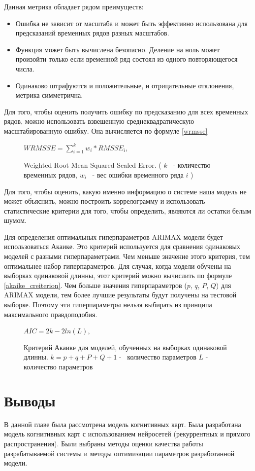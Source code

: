 Данная метрика обладает рядом преимуществ:

\begin{itemize}
	\item Ошибка не зависит от масштаба и может быть эффективно использована для предсказаний временных рядов разных масштабов.
	\item Функция может быть вычислена безопасно. Деление на ноль может произойти только если временной ряд состоял из одного повторяющегося числа.
	\item Одинаково штрафуются и положительные, и отрицательные отклонения, метрика симметрична.
\end{itemize}

Для того, чтобы оценить получить ошибку по предсказанию для всех временных рядов,
можно использовать взвешенную среднеквадратическую масштабированную ошибку.
Она вычисляется по формуле \ref{wrmsse}

\def\figurename{Формула}
\begin{figure}
	\centering
	$ WRMSSE = \sum_{i=1}^{k} w_i * RMSSE_i $,
	\caption{
		Weighted Root Mean Squared Scaled Error.
		(
			$ k $ ~- количество временных рядов,
			$ w_i $ ~- вес ошибки временного ряда $ i $
		)
	}
	\label{img:wrmsse}
\end{figure}
\def\figurename{Рис.}

Для того, чтобы оценить, какую именно информацию о системе наша
модель не может объяснить, можно построить коррелограмму и использовать
статистические критерии для того, чтобы определить, являются ли остатки
белым шумом.

Для определения оптимальных гиперпараметров ARIMAX модели будет использоваться Акаике.
Это критерий используется для сравнения одинаковых моделей с разными гиперпараметрами.
Чем меньше значение этого критерия, тем оптимальнее набор гиперпараметров.
Для случая, когда модели обучены на выборках одинаковой длинны, этот критерий можно вычислить по формуле \ref{akaike_creiterion}.
Чем больше значения гиперпараметров ($ p $, $ q $, $ P $, $ Q $) для ARIMAX модели, тем более лучшие
результаты будут получены на тестовой выборке. Поэтому эти гиперпараметры нельзя
выбирать из принципа максимального правдоподобия.

\def\figurename{Формула}
\begin{figure}
	\centering
	$ AIC = 2k - 2 ln(L) $,
	\caption{
		Критерий Акаике для моделей, обученных на выборках одинаковой длинны.
		$ k = p + q + P + Q + 1 $ -~ количество параметров
		$ L $ -~ количество параметров
	}
	\label{img:akaike_creiterion}
\end{figure}
\def\figurename{Рис.}


\section{Выводы}

В данной главе была рассмотрена модель когнитивных карт.
Была разработана модель когнитивных карт
с использованием нейросетей (рекуррентных и прямого распространения).
Были выбраны методы оценки качества работы разрабатываемой системы
и методы оптимизации параметров разработанной модели.